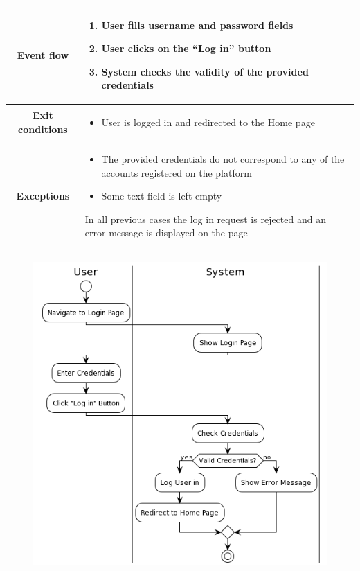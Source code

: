 \begin{center}
\begin{tabular}{ |c|m{10cm}| }
        \hline
        \textbf{Event flow} &
        \begin{enumerate}
            \item User fills username and password fields
            \item User clicks on the “Log in” button
            \item System checks the validity of the provided credentials
        \end{enumerate} \\
        \hline
        \textbf{Exit conditions} &
        \begin{itemize}
            \item User is logged in and redirected to the Home page
        \end{itemize} \\
        \hline
        \textbf{Exceptions} & 
        \begin{itemize}
            \item The provided credentials do not correspond to any of the accounts registered on the platform
            \item Some text field is left empty
        \end{itemize} 
        In all previous cases the log in request is rejected and an error message is displayed on the page \\
        \hline
    \end{tabular}
    \begin{figure}[H]
        \hspace{57px}
        \includegraphics[scale=0.5]{Diagrams/activity_login.png}

\end{figure}
\end{center}
